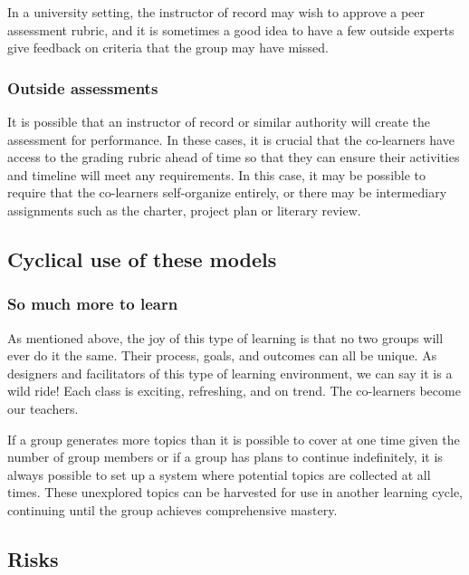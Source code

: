 In a university setting, the instructor of record may wish to approve a
peer assessment rubric, and it is sometimes a good idea to have a few
outside experts give feedback on criteria that the group may have
missed.

\subsubsection{Outside assessments}\label{outside-assessments}

It is possible that an instructor of record or similar authority will
create the assessment for performance. In these cases, it is crucial
that the co-learners have access to the grading rubric ahead of time so
that they can ensure their activities and timeline will meet any
requirements. In this case, it may be possible to require that the
co-learners self-organize entirely, or there may be intermediary
assignments such as the charter, project plan or literary review.

\subsection{Cyclical use of these
models}\label{cyclical-use-of-these-models}

\subsubsection{So much more to learn}\label{so-much-more-to-learn}

As mentioned above, the joy of this type of learning is that no two
groups will ever do it the same. Their process, goals, and outcomes can
all be unique. As designers and facilitators of this type of learning
environment, we can say it is a wild ride! Each class is exciting,
refreshing, and on trend. The co-learners become our teachers.

If a group generates more topics than it is possible to cover at one
time given the number of group members or if a group has plans to
continue indefinitely, it is always possible to set up a system where
potential topics are collected at all times. These unexplored topics can
be harvested for use in another learning cycle, continuing until the
group achieves comprehensive mastery.

\subsection{Risks}\label{risks}

